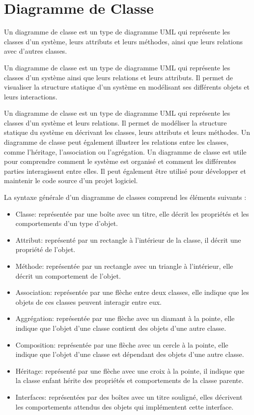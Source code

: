 \newpage
\section{Diagramme de Classe}\label{sec:diagrammeclasse}

\begin{definition}
Un diagramme de classe est un type de diagramme UML qui représente les classes d'un système, leurs attributs et leurs méthodes, ainsi que leurs relations avec d'autres classes.

Un diagramme de classe est un type de diagramme UML qui représente les classes d'un système ainsi que leurs relations et leurs attributs. Il permet de visualiser la structure statique d'un système en modélisant ses différents objets et leurs interactions.

Un diagramme de classe est un type de diagramme UML qui représente les classes d'un système et leurs relations. Il permet de modéliser la structure statique du système en décrivant les classes, leurs attributs et leurs méthodes. Un diagramme de classe peut également illustrer les relations entre les classes, comme l'héritage, l'association ou l'agrégation. Un diagramme de classe est utile pour comprendre comment le système est organisé et comment les différentes parties interagissent entre elles. Il peut également être utilisé pour développer et maintenir le code source d'un projet logiciel.
\end{definition}

La syntaxe générale d'un diagramme de classes comprend les éléments suivants :
\begin{itemize}
\item Classe: représentée par une boîte avec un titre, elle décrit les propriétés et les comportements d'un type d'objet.
\item Attribut: représenté par un rectangle à l'intérieur de la classe, il décrit une propriété de l'objet.
\item Méthode: représentée par un rectangle avec un triangle à l'intérieur, elle décrit un comportement de l'objet.
\item Association: représentée par une flèche entre deux classes, elle indique que les objets de ces classes peuvent interagir entre eux.
\item Aggrégation: représentée par une flèche avec un diamant à la pointe, elle indique que l'objet d'une classe contient des objets d'une autre classe.
\item Composition: représentée par une flèche avec un cercle à la pointe, elle indique que l'objet d'une classe est dépendant des objets d'une autre classe.
\item Héritage: représenté par une flèche avec une croix à la pointe, il indique que la classe enfant hérite des propriétés et comportements de la classe parente.
\item Interfaces: représentées par des boîtes avec un titre souligné, elles décrivent les comportements attendus des objets qui implémentent cette interface.
\end{itemize}




